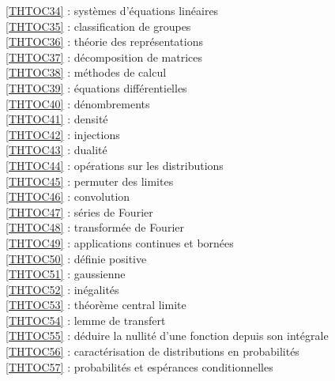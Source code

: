 \ref {THTOC34} : systèmes d'équations linéaires\\
\ref {THTOC35} : classification de groupes\\
\ref {THTOC36} : théorie des représentations\\
\ref {THTOC37} : décomposition de matrices\\
\ref {THTOC38} : méthodes de calcul\\
\ref {THTOC39} : équations différentielles\\
\ref {THTOC40} : dénombrements\\
\ref {THTOC41} : densité\\
\ref {THTOC42} : injections\\
\ref {THTOC43} : dualité\\
\ref {THTOC44} : opérations sur les distributions\\
\ref {THTOC45} : permuter des limites\\
\ref {THTOC46} : convolution\\
\ref {THTOC47} : séries de Fourier\\
\ref {THTOC48} : transformée de Fourier\\
\ref {THTOC49} : applications continues et bornées\\
\ref {THTOC50} : définie positive\\
\ref {THTOC51} : gaussienne\\
\ref {THTOC52} : inégalités\\
\ref {THTOC53} : théorème central limite\\
\ref {THTOC54} : lemme de transfert\\
\ref {THTOC55} : déduire la nullité d'une fonction depuis son intégrale\\
\ref {THTOC56} : caractérisation de distributions en probabilités\\
\ref {THTOC57} : probabilités et espérances conditionnelles\\
